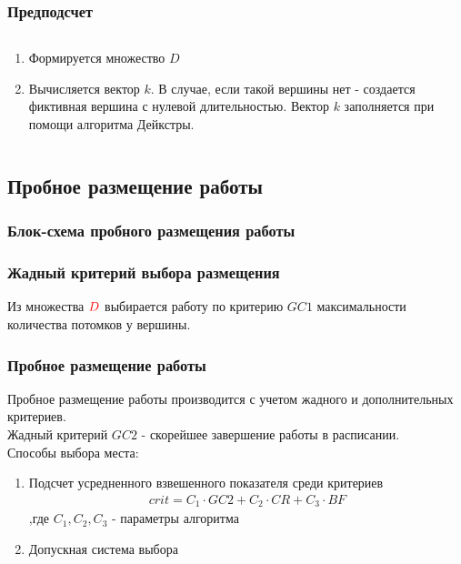 \documentclass[hyperref=unicode, aspectratio=169]{beamer}
\begin{document}
\begin{frame}
    \frametitle{Предподсчет}
    \begin{columns}
        \begin{column}{0.6\textwidth}
            \begin{enumerate}
                \item Формируется множество $D$
                \item Вычисляется вектор $k$. В случае, если такой вершины нет - создается фиктивная вершина с нулевой длительностью. Вектор $k$ заполняется при помощи алгоритма Дейкстры.
            \end{enumerate}
        \end{column}
        \begin{column}{0.4\textwidth}
        \end{column}
    \end{columns}
\end{frame}


\subsection{Пробное размещение работы}
\begin{frame}
    \frametitle{Блок-схема пробного размещения работы}
    {\tiny
    }
\end{frame}

\begin{frame}
    \frametitle{Жадный критерий выбора размещения}
    Из множества $\color{red}D$ выбирается работу по критерию $GC1$ максимальности количества потомков у вершины.
\end{frame}

\begin{frame}
    \frametitle{Пробное размещение работы}
    Пробное размещение работы производится с учетом  жадного и дополнительных критериев. \\
    Жадный критерий $GC2$ - скорейшее завершение работы в расписании. \\
    Способы выбора места:
    \begin{enumerate}
        \item Подсчет усредненного взвешенного показателя среди критериев \\
              \begin{gather*}
                  crit = C_1 \cdot GC2 + C_2 \cdot CR + C_3 \cdot BF
              \end{gather*}
              ,где $C_1, C_2, C_3$ - параметры алгоритма
        \item Допускная система выбора
    \end{enumerate}
\end{frame}
\end{document}
